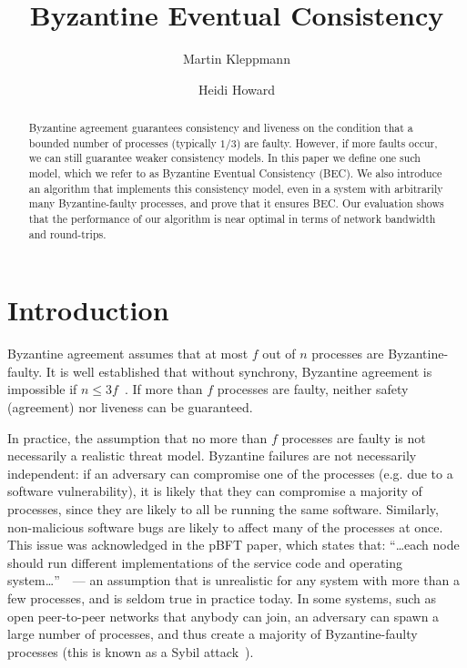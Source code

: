\documentclass[a4paper,anonymous,USenglish]{lipics-v2019}
\title{Byzantine Eventual Consistency}
\author{Martin Kleppmann}{University of Cambridge}{mk428@cst.cam.ac.uk}{https://orcid.org/0000-0001-7252-6958}{Supported by a Leverhulme Trust Early Career Fellowship and by the Isaac Newton Trust.}
\author{Heidi Howard}{University of Cambridge}{hh360@cst.cam.ac.uk}{https://orcid.org/0000-0001-5256-7664}{}
\begin{document}
\maketitle
\begin{abstract}
    Byzantine agreement guarantees consistency and liveness on the condition that a bounded number of processes (typically $1/3$) are faulty.
    However, if more faults occur, we can still guarantee weaker consistency models. 
    In this paper we define one such model, which we refer to as Byzantine Eventual Consistency (BEC).
    We also introduce an algorithm that implements this consistency model, even in a system with arbitrarily many Byzantine-faulty processes, and prove that it ensures BEC.
    Our evaluation shows that the performance of our algorithm is near optimal in terms of network bandwidth and round-trips.
\end{abstract}
\maketitle

\section{Introduction}

Byzantine agreement assumes that at most $f$ out of $n$ processes are Byzantine-faulty.
It is well established that without synchrony, Byzantine agreement is impossible if $n\leq3f$~\cite{Dwork:1988,Lamport:1982}.
If more than $f$ processes are faulty, neither safety (agreement) nor liveness can be guaranteed.

In practice, the assumption that no more than $f$ processes are faulty is not necessarily a realistic threat model.
Byzantine failures are not necessarily independent: if an adversary can compromise one of the processes (e.g. due to a software vulnerability), it is likely that they can compromise a majority of processes, since they are likely to all be running the same software. 
Similarly, non-malicious software bugs are likely to affect many of the processes at once.
This issue was acknowledged in the pBFT paper, which states that: ``{\dots}each node should run different implementations of the service code and operating system{\dots}''~\cite{Castro:1999}~--- an assumption that is unrealistic for any system with more than a few processes, and is seldom true in practice today.
In some systems, such as open peer-to-peer networks that anybody can join, an adversary can spawn a large number of processes, and thus create a majority of Byzantine-faulty processes (this is known as a Sybil attack~\cite{Douceur:2002}).
\end{document}
